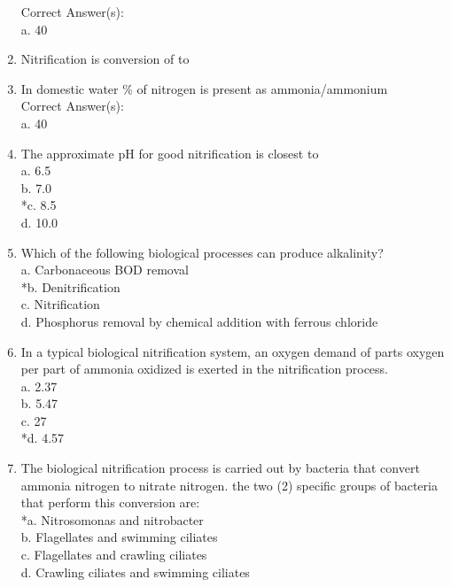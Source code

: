 \begin{enumerate}
Correct Answer(s):\\
a. 40 

\item Nitrification is conversion of {\underline{\hspace{1cm}}} to {\underline{\hspace{1cm}}}

\item In domestic water {\underline{\hspace{1cm}}} \% of nitrogen is present as ammonia/ammonium \\

Correct Answer(s):\\
a. 40 

\item The approximate pH for good nitrification is closest to \\

a. 6.5 \\
b. 7.0 \\
*c. 8.5 \\
d. 10.0 

\item Which of the following biological processes can produce alkalinity? \\

a. Carbonaceous BOD removal \\
*b. Denitrification \\
c. Nitrification \\
d. Phosphorus removal by chemical addition with ferrous chloride 

\item In a typical biological nitrification system, an oxygen demand of {\underline{\hspace{1cm}}} parts oxygen per part of ammonia oxidized is exerted in the nitrification process. \\

a. 2.37 \\
b. 5.47 \\
c. 27 \\
*d. 4.57 

\item The biological nitrification process is carried out by bacteria that convert ammonia nitrogen to nitrate nitrogen. the two (2) specific groups of bacteria that perform this conversion are: \\

*a. Nitrosomonas and nitrobacter \\
b. Flagellates and swimming ciliates \\
c. Flagellates and crawling ciliates \\
d. Crawling ciliates and swimming ciliates 


\end{enumerate}
